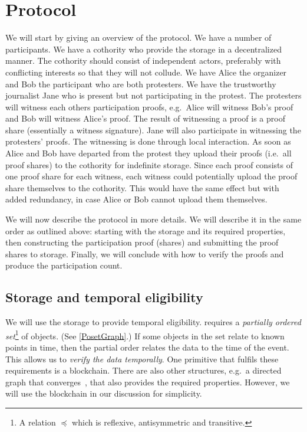 \section{Protocol}

We will start by giving an overview of the protocol.
We have a number of participants.
We have a cothority who provide the storage in a decentralized manner.
The cothority should consist of independent actors, preferably with conflicting 
interests so that they will not collude.
We have Alice the organizer and Bob the participant who are both protesters.
We have the trustworthy journalist Jane who is present but not participating in 
the protest.
The protesters will witness each others participation proofs, e.g.\ Alice will 
witness Bob's proof and Bob will witness Alice's proof.
The result of witnessing a proof is a proof share (essentially a witness 
signature).
Jane will also participate in witnessing the protesters' proofs.
The witnessing is done through local interaction.
As soon as Alice and Bob have departed from the protest they upload their proofs 
(i.e.\ all proof shares) to the cothority for indefinite storage.
Since each proof consists of one proof share for each witness, each witness 
could potentially upload the proof share themselves to the cothority.
This would have the same effect but with added redundancy, in case Alice or Bob 
cannot upload them themselves.

We will now describe the protocol in more details.
We will describe it in the same order as outlined above:
starting with the storage and its required properties, then constructing the 
participation proof (shares) and submitting the proof shares to storage.
Finally, we will conclude with how to verify the proofs and produce the 
participation count.

\subsection{Storage and temporal eligibility}

We will use the storage to provide temporal eligibility.
 requires a \emph{partially ordered 
  set}\footnote{%
  A relation \(\preceq\) which is reflexive, antisymmetric and transitive.
} of objects.
(See \cref{PosetGraph}.)
If some objects in the set relate to known points in time, then the partial 
order relates the data to the time of the event.
This allows us to \emph{verify the data temporally}.
One primitive that fulfils these requirements is a blockchain.
There are also other structures, e.g.\ a directed graph that 
converges~\cite{BlockchainFreeCryptocurrencies}, that also provides the required 
properties.
However, we will use the blockchain in our discussion for simplicity.

